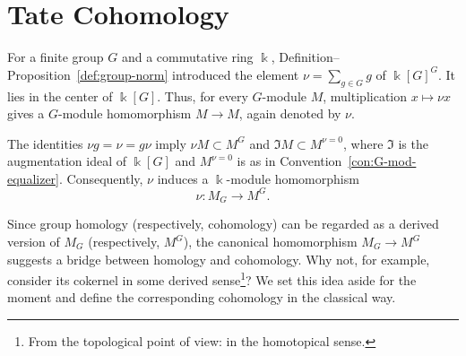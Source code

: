 
\section{Tate Cohomology}\label{sec:Tate-coh}
\hypertarget{o014.aljabr2.chapter6.tate-cohomology}{ }

For a finite group $G$ and a commutative ring $\Bbbk$,
Definition--Proposition~\ref{def:group-norm} introduced the element
$\nu = \sum_{g \in G} g$ of $\Bbbk[G]^G$. It lies in the center of
$\Bbbk[G]$. Thus, for every $G$-module $M$, multiplication
$x \mapsto \nu x$ gives a $G$-module homomorphism $M \to M$, again denoted
by $\nu$.

The identities $\nu g = \nu = g \nu$ imply
$\nu M \subset M^G$ and $\mathfrak{I}M \subset M^{\nu = 0}$, where
$\mathfrak{I}$ is the augmentation ideal of $\Bbbk[G]$ and $M^{\nu=0}$ is as
in Convention~\ref{con:G-mod-equalizer}. Consequently, $\nu$ induces a
$\Bbbk$-module homomorphism
\begin{equation}\label{eqn:nu-coinv-inv}
	\nu: M_G \to M^G .
\end{equation}

Since group homology (respectively, cohomology) can be regarded as a derived
version of $M_G$ (respectively, $M^G$), the canonical homomorphism
$M_G \to M^G$ suggests a bridge between homology and cohomology. Why not, for
example, consider its cokernel in some derived sense\footnote{From the
topological point of view: in the homotopical sense.}? We set this idea aside
for the moment and define the corresponding cohomology in the classical way.

